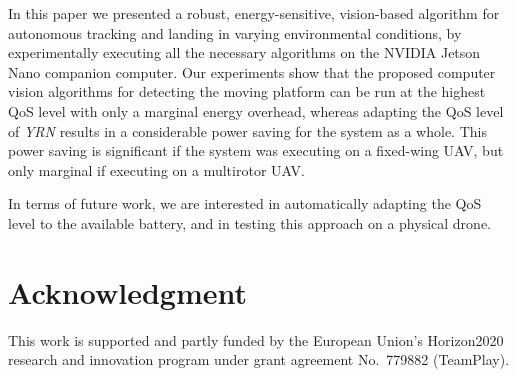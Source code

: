 \documentclass[conference]{IEEEtran}
\begin{document}
In this paper we presented a robust, energy-sensitive, vision-based
algorithm for autonomous tracking and landing in varying environmental
conditions, by experimentally executing all the necessary algorithms on 
the NVIDIA Jetson Nano companion computer.
%
Our experiments show that the proposed computer vision algorithms for 
detecting the moving platform can be run at the highest QoS level with only a marginal
energy overhead, whereas adapting the QoS level of \emph{YRN}
results in a considerable power saving for the system as a whole. 
This power saving is significant if the system was executing on a fixed-wing UAV, %
but only marginal if executing on a multirotor UAV.

In terms of future work, we are interested in automatically adapting
the QoS level to the available battery, and in testing this approach
on a physical drone.

\section*{Acknowledgment}

This work is supported and partly funded by the European Union’s
Horizon2020 research and innovation program under grant agreement
No.~779882 (TeamPlay).


 
\vspace{1ex}
\end{document}

